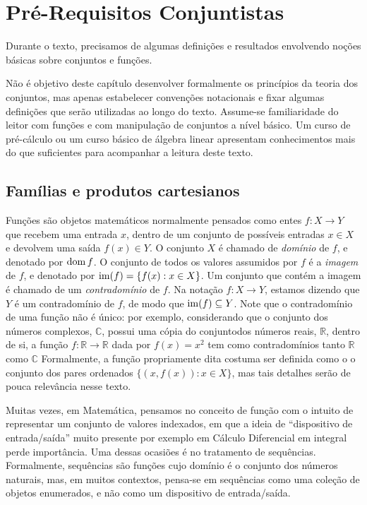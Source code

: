 
\chapter{Pré-Requisitos Conjuntistas}
Durante o texto, precisamos de algumas definições e resultados envolvendo noções básicas sobre conjuntos e funções.

Não é objetivo deste capítulo desenvolver formalmente os princípios da teoria dos conjuntos, mas apenas estabelecer convenções notacionais e fixar algumas definições que serão utilizadas ao longo do texto. Assume-se familiaridade do leitor com funções e com manipulação de conjuntos a nível básico.
Um curso de pré-cálculo ou um curso básico de álgebra linear apresentam conhecimentos mais do que suficientes para acompanhar a leitura deste texto.

\section{Famílias e produtos cartesianos}

Funções são objetos matemáticos normalmente pensados como entes $f:X\rightarrow Y$ que recebem uma entrada $x$, dentro de um conjunto de possíveis entradas $x \in X$ e devolvem uma saída $f(x)\in Y$.
O conjunto $X$ é chamado de \emph{domínio} de $f$, e denotado por $\operatorname{dom} f$. O conjunto de todos os valores assumidos por $f$ é a \emph{imagem} de $f$, e denotado por $\operatorname{im}(f)=\{f(x): x \in X\}$.
Um conjunto que contém a imagem é chamado de um \emph{contradomínio} de $f$.
Na notação $f:X\rightarrow Y$, estamos dizendo que $Y$ é um contradomínio de $f$, de modo que $\operatorname{im}(f)\subseteq Y$.
Note que o contradomínio de uma função não é único: por exemplo, considerando que o conjunto dos números complexos, $\mathbb C$, possui uma cópia do conjuntodos números reais, $\mathbb R$, dentro de si, a função $f:\mathbb R\rightarrow \mathbb R$ dada por $f(x)=x^2$ tem como contradomínios tanto $\mathbb R$ como $\mathbb C$
Formalmente, a função propriamente dita costuma ser definida como o o conjunto dos pares ordenados $\{(x, f(x)): x \in X\}$, mas tais detalhes serão de pouca relevância nesse texto.

Muitas vezes, em Matemática, pensamos no conceito de função com o intuito de representar um conjunto de valores indexados, em que a ideia de ``dispositivo de entrada/saída'' muito presente por exemplo em Cálculo Diferencial em integral perde importância. Uma dessas ocasiões é no tratamento de sequências. Formalmente, sequências são funções cujo domínio é o conjunto dos números naturais, mas, em muitos contextos, pensa-se em sequências como uma coleção de objetos enumerados, e não como um dispositivo de entrada/saída.

